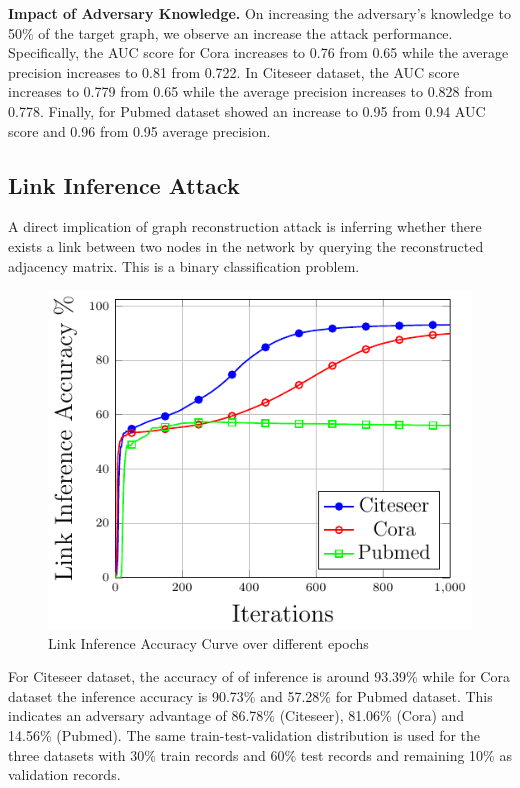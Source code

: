 \noindent\textbf{Impact of Adversary Knowledge.} On increasing the adversary's knowledge to 50\% of the target graph, we observe an increase the attack performance.
Specifically, the AUC score for Cora increases to 0.76 from 0.65 while the average precision increases to 0.81 from 0.722.
In Citeseer dataset, the AUC score increases to 0.779 from 0.65 while the average precision increases to 0.828 from 0.778.
Finally, for Pubmed dataset showed an increase to 0.95 from 0.94 AUC score and 0.96 from 0.95 average precision.



\subsection{Link Inference Attack}

A direct implication of graph reconstruction attack is inferring whether there exists a link between two nodes in the network by querying the reconstructed adjacency matrix.
This is a binary classification problem.

\begin{figure}
  \begin{center}
    \includegraphics[width=0.5\linewidth]{figures/LinkInfer/LinkInfer.pdf}
  \end{center}
  \caption{Link Inference Accuracy Curve over different epochs}
\end{figure}

\noindent For Citeseer dataset, the accuracy of of inference is around 93.39\% while for Cora dataset the inference accuracy is 90.73\% and 57.28\% for Pubmed dataset.
This indicates an adversary advantage of 86.78\% (Citeseer), 81.06\% (Cora) and 14.56\% (Pubmed).
The same train-test-validation distribution is used for the three datasets with 30\% train records and 60\% test records and remaining 10\% as validation records.



